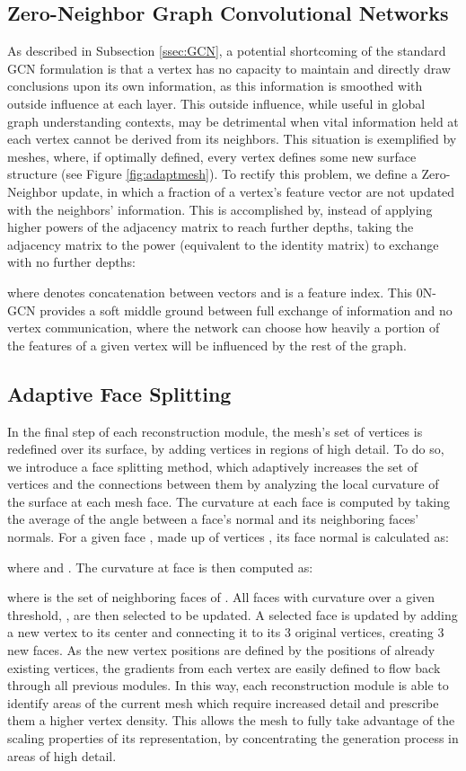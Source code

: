 \documentclass{article}
\begin{document}
\subsection{Zero-Neighbor Graph Convolutional Networks}
\label{ssec:0nGCN}
As described in Subsection \ref{ssec:GCN}, a potential shortcoming of the standard GCN formulation is that a vertex has no capacity to maintain and directly draw conclusions upon its own information, as this information is smoothed with outside influence at each layer. This outside influence, while useful in global graph understanding contexts, may be detrimental when vital information held at each vertex cannot be derived from its neighbors. This situation is exemplified by meshes, where, if optimally defined, every vertex defines some new surface structure (see Figure \ref{fig:adaptmesh}). To rectify this problem, we define a Zero-Neighbor update, in which a fraction of a vertex's feature vector are not updated with the neighbors' information. This is accomplished by, instead of applying higher powers of the adjacency matrix to reach further depths, taking the adjacency matrix to the power  (equivalent to the identity matrix) to exchange with no further depths:

where  denotes concatenation between vectors and  is a feature index. 
This 0N-GCN provides a soft middle ground between full exchange of information and no vertex communication, where the network can choose how heavily a portion of the features of a given vertex will be influenced by the rest of the graph.

\subsection{Adaptive Face Splitting}
\label{ssec:facesplit}

In the final step of each reconstruction module, the mesh's set of vertices is redefined over its surface, by adding vertices in regions of high detail. To do so, we introduce a face splitting method, which adaptively increases the set of vertices and the connections between them by analyzing the local curvature of the surface at each mesh face. 
The curvature at each face is computed by taking the average of the angle between a face's normal and its neighboring faces' normals. For a given face , made up of vertices , its face normal  is calculated as:

where  and . The curvature  at face  is then computed as: 

where  is the set of neighboring faces of .
All faces with curvature over a given threshold, , are then selected to be updated. A selected face is updated by adding a new vertex to its center and connecting it to its 3 original vertices, creating 3 new faces. As the new vertex positions are defined by the positions of already existing vertices, the gradients from each vertex are easily defined to flow back through all previous modules. In this way, each reconstruction module is able to identify areas of the current mesh which require increased detail and prescribe them a higher vertex density. This allows the mesh to fully take advantage of the scaling properties of its representation, by concentrating the generation process in areas of high detail.
\end{document}
